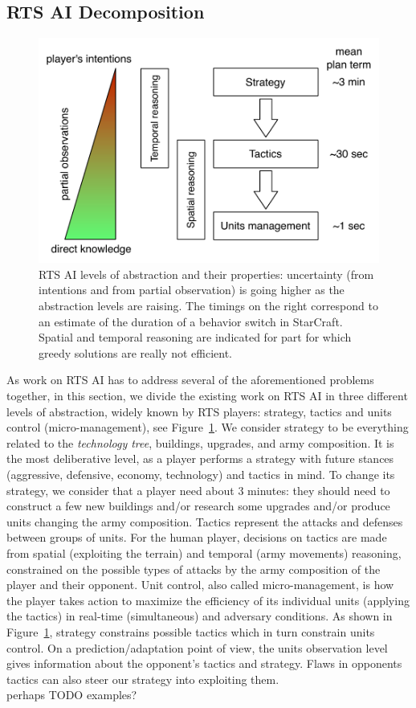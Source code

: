 \documentclass[journal]{IEEEtran}
\begin{document}
\subsection{RTS AI Decomposition}
\begin{figure}
    \centering
    \includegraphics[width=0.9\columnwidth]{figures/levels_abstraction.pdf}
    \caption{RTS AI levels of abstraction and their properties: uncertainty (from intentions and from partial observation) is going higher as the abstraction levels are raising. The timings on the right correspond to an estimate of the duration of a behavior switch in StarCraft. Spatial and temporal reasoning are indicated for part for which greedy solutions are really not efficient.}
    \label{fig:levels-abstraction}
\end{figure}
As work on RTS AI has to address several of the aforementioned problems together, in this section, we divide the existing work on RTS AI in three different levels of abstraction, widely known by RTS players: strategy, tactics and units control (micro-management), see Figure~\ref{fig:levels-abstraction}. We consider strategy to be everything related to the \textit{technology tree}, buildings, upgrades, and army composition. It is the most deliberative level, as a player performs a strategy with future stances (aggressive, defensive, economy, technology) and tactics in mind. To change its strategy, we consider that a player need about 3 minutes: they should need to construct a few new buildings and/or research some upgrades and/or produce units changing the army composition. Tactics represent the attacks and defenses between groups of units. For the human player, decisions on tactics are made from spatial (exploiting the terrain) and temporal (army movements) reasoning, constrained on the possible types of attacks by the army composition of the player and their opponent. Unit control, also called micro-management, is how the player takes action to maximize the efficiency of its individual units (applying the tactics) in real-time (simultaneous) and adversary conditions. As shown in Figure~\ref{fig:levels-abstraction}, strategy constrains possible tactics which in turn constrain units control. On a prediction/adaptation point of view, the units observation level gives information about the opponent's tactics and strategy. Flaws in opponents tactics can also steer our strategy into exploiting them.\\
{\color{blue}
perhaps TODO examples?
}
\end{document}
